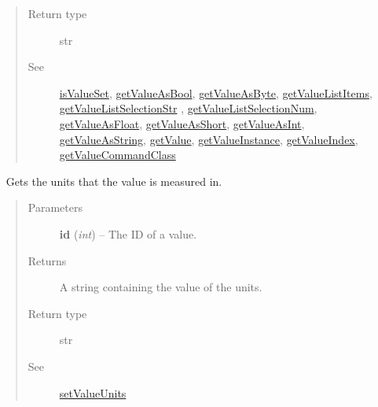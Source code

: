 \documentclass[letterpaper,10pt,english]{sphinxmanual}
\begin{document}
\begin{fulllineitems}
\begin{fulllineitems}
\begin{quote}
\begin{description}
\item[{Return type}] \leavevmode
str

\item[{See}] \leavevmode
{\hyperref[libopenzwave:isvalueset]{isValueSet}}, {\hyperref[libopenzwave:getvalueasbool]{getValueAsBool}}, {\hyperref[libopenzwave:getvalueasbyte]{getValueAsByte}}, {\hyperref[libopenzwave:getvaluelistitems]{getValueListItems}}, {\hyperref[libopenzwave:getvaluelistselectionstr]{getValueListSelectionStr}} , {\hyperref[libopenzwave:getvaluelistselectionnum]{getValueListSelectionNum}}, {\hyperref[libopenzwave:getvalueasfloat]{getValueAsFloat}}, {\hyperref[libopenzwave:getvalueasshort]{getValueAsShort}}, {\hyperref[libopenzwave:getvalueasint]{getValueAsInt}}, {\hyperref[libopenzwave:getvalueasstring]{getValueAsString}}, {\hyperref[libopenzwave:getvalue]{getValue}}, {\hyperref[libopenzwave:getvalueinstance]{getValueInstance}}, {\hyperref[libopenzwave:getvalueindex]{getValueIndex}}, {\hyperref[libopenzwave:getvaluecommandclass]{getValueCommandClass}}

\end{description}\end{quote}

\end{fulllineitems}


\begin{fulllineitems}
\label{libopenzwave:libopenzwave.PyManager.getValueUnits}~\label{libopenzwave:getvalueunits}
Gets the units that the value is measured in.
\begin{quote}\begin{description}
\item[{Parameters}] \leavevmode
\textbf{id} (\emph{int}) -- The ID of a value.

\item[{Returns}] \leavevmode
A string containing the value of the units.

\item[{Return type}] \leavevmode
str

\item[{See}] \leavevmode
{\hyperref[libopenzwave:setvalueunits]{setValueUnits}}

\end{description}\end{quote}

\end{fulllineitems}


\end{fulllineitems}
\end{document}
